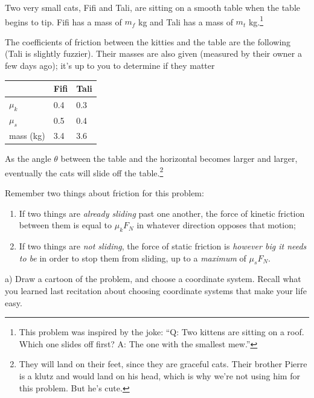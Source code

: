 \documentclass[12pt]{article}
\begin{document}
\Large
\centerline{}
\normalsize
\centerline{}

Two very small cats, Fifi and Tali, are sitting on a smooth table when the table begins to tip. Fifi has a mass of $m_f$ kg and Tali has a mass of $m_t$ kg.\footnote{This problem was inspired by the joke: ``Q: Two kittens are sitting on a roof. Which one slides off first? A: The one with the smallest mew.''}

\begin{minipage}{0.6\textwidth}
The coefficients of friction between the kitties and the table are the following (Tali is slightly fuzzier). Their masses are also
given (measured by their owner a few days ago); it's up to you to determine if they matter
\end{minipage}\hspace{0.1\textwidth}
\begin{minipage}{0.3\textwidth}
\begin{tabular}{|l|l|l|}
\hline
        & Fifi & Tali \\ \hline
$\mu_k$ & 0.4  & 0.3  \\ \hline
$\mu_s$ & 0.5  & 0.4  \\ \hline
mass (kg) & 3.4 & 3.6 \\ \hline
\end{tabular}
\end{minipage}

As the angle $\theta$ between the table and the horizontal becomes larger and larger, eventually the cats will slide off the 
table.\footnote{They will land on their feet, since they are graceful cats. Their brother Pierre is a klutz and would land on his head, which is why we're not using him for this problem. But he's cute.}

Remember two things about friction for this problem:

\begin{enumerate}
\item If two things are {\it already sliding} past one another, the force of kinetic friction between them is equal to $\mu_k F_N$ in whatever direction opposes that motion;
\item If two things are {\it not sliding}, the force of static friction is {\it however big it needs to be} in order to stop
them from sliding, up to a {\it maximum} of $\mu_s F_N$.
\end{enumerate}

a) Draw a cartoon of the problem, and choose a coordinate system. Recall what you learned last recitation about choosing
coordinate systems that make your life easy.
\end{document}
